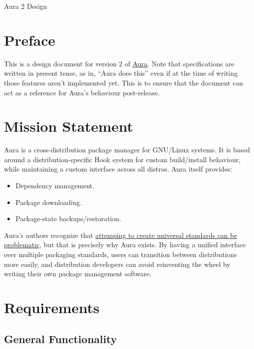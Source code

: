 \documentclass{article}
\begin{document}

\tableofcontents
\clearpage

Aura 2 Design

\section{Preface}\label{preface}

This is a design document for version 2 of
\href{https://github.com/fosskers/aura}{Aura}. Note that specifications
are written in present tense, as in, ``Aura does this'' even if at the
time of writing those features aren't implemented yet. This is to ensure
that the document can act as a reference for Aura's behaviour
post-release.

\section{Mission Statement}\label{mission-statement}

Aura is a cross-distribution package manager for GNU/Linux systems. It
is based around a distribution-specific Hook system for custom
build/install behaviour, while maintaining a custom interface across all
distros. Aura itself provides:

\begin{itemize}
\itemsep1pt\parskip0pt
\item
  Dependency management.
\item
  Package downloading.
\item
  Package-state backups/restoration.
\end{itemize}

Aura's authors recognize that \href{http://www.xkcd.com/927/}{attemping
to create universal standards can be problematic}, but that is precisely
why Aura exists. By having a unified interface over multiple packaging
standards, users can transition between distributions more easily, and
distribution developers can avoid reinventing the wheel by writing their
own package management software.

\section{Requirements}\label{requirements}

\subsection{General Functionality}\label{general-functionality}
\end{document}
